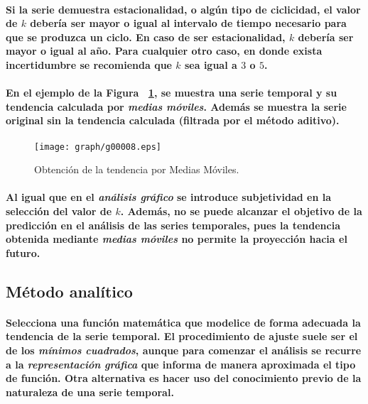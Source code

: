 \paragraph{
Si la serie demuestra estacionalidad, o algún tipo de ciclicidad, el valor de $k$ debería ser mayor o igual al intervalo de tiempo necesario para que se produzca un ciclo. En caso de ser estacionalidad, $k$ debería ser mayor o igual al año. Para cualquier otro caso, en donde exista incertidumbre se recomienda que $k$ sea igual a $3$ o $5$.
}
\paragraph*{
En el ejemplo de la Figura ~\ref{fig:TendenciaMediasMoviles}, se muestra una serie temporal y su tendencia calculada por \emph{medias móviles}. Además se muestra la serie original sin la tendencia calculada (filtrada por el método aditivo\footnotemark[2]).
}
\begin{figure}[ht]
\centering
\texttt{[image: graph/g00008.eps]}
\caption[Medias Móviles]{Obtención de la tendencia por Medias Móviles.}
\label{fig:TendenciaMediasMoviles}
\end{figure}
\paragraph{
Al igual que en el \emph{análisis gráfico} se introduce subjetividad en la selección del valor de $k$. Además, no se puede alcanzar el objetivo de la predicción en el análisis de las series temporales, pues la tendencia obtenida mediante \emph{medias móviles} no permite la proyección hacia el futuro.
}


\subsection{Método analítico}
\paragraph{
Selecciona una función matemática que modelice de forma adecuada la tendencia de la serie temporal. El procedimiento de ajuste suele ser el de los \emph{mínimos cuadrados}, aunque para comenzar el análisis se recurre a la \emph{representación gráfica} que informa de manera aproximada el tipo de función. Otra alternativa es hacer uso del conocimiento previo de la naturaleza de una serie temporal.
}
